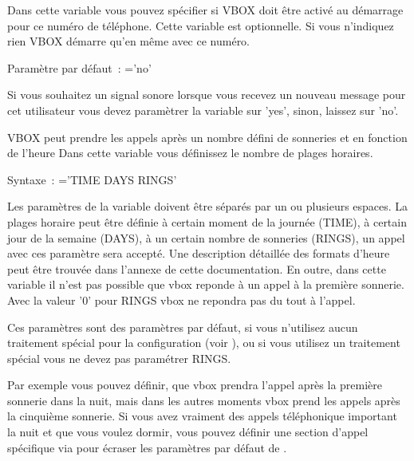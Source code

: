 \begin{description}
    Dans cette variable vous pouvez spécifier si VBOX doit être activé au démarrage pour ce numéro
	de téléphone. Cette variable est optionnelle. Si vous n'indiquez rien VBOX démarre qu'en même
	avec ce numéro.


    Paramètre par défaut~: ='no'

    Si vous souhaitez un signal sonore lorsque vous recevez un nouveau message pour cet utilisateur
	vous devez paramètrer la variable sur 'yes', sinon, laissez sur 'no'.



    VBOX peut prendre les appels après un nombre défini de sonneries et en fonction de l'heure
	Dans cette variable vous définissez le nombre de plages horaires.


    Syntaxe~: ='TIME DAYS RINGS'

    Les paramètres de la variable  doivent être séparés par
	un ou plusieurs espaces. La plages horaire peut être définie à certain moment de la journée
	(TIME), à certain jour de la semaine (DAYS), à un certain nombre de sonneries (RINGS), un appel
	avec ces paramètre sera accepté. Une description détaillée des formats d'heure peut être trouvée
	dans l'annexe de cette documentation. En outre, dans cette variable il n'est pas possible que
	vbox reponde à un appel à la première sonnerie. Avec la valeur '0' pour RINGS vbox ne repondra
	pas du tout à l'appel.

    Ces paramètres sont des paramètres par défaut, si vous n'utilisez aucun traitement spécial pour
	la configuration (voir ), ou si vous utilisez un traitement spécial
	vous ne devez pas paramétrer RINGS.

    Par exemple vous pouvez définir, que vbox prendra l'appel après la première sonnerie dans la
	nuit, mais dans les autres moments vbox prend les appels après la cinquième sonnerie. Si vous
	avez vraiment des appels téléphonique important la nuit et que vous voulez dormir, vous pouvez
	définir une section d'appel spécifique via  pour écraser les paramètres
	par défaut de .

\end{description}

